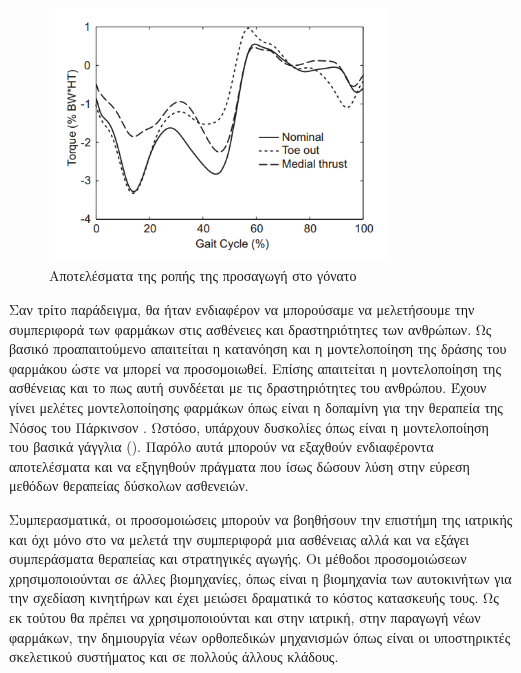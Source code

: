 \begin{figure}[H]
    \centering
    \includegraphics[width=0.8\textwidth]{introduction/fig/knee-load.png}
    \caption{Αποτελέσματα της ροπής της προσαγωγή στο γόνατο\cite{fregly07}}
    \label{fig:knee-load}
\end{figure}

Σαν τρίτο παράδειγμα, θα ήταν ενδιαφέρον να μπορούσαμε να μελετήσουμε την συμπεριφορά των φαρμάκων στις ασθένειες και δραστηριότητες των ανθρώπων. Ως βασικό προαπαιτούμενο απαιτείται η κατανόηση και η μοντελοποίηση της δράσης του φαρμάκου ώστε να μπορεί να προσομοιωθεί. Επίσης απαιτείται η μοντελοποίηση της ασθένειας και το πως αυτή συνδέεται με τις δραστηριότητες του ανθρώπου. Έχουν γίνει μελέτες μοντελοποίησης φαρμάκων όπως είναι η δοπαμίνη για την θεραπεία της Νόσος του Πάρκινσον \cite{haeri05}. Ωστόσο, υπάρχουν δυσκολίες όπως είναι η μοντελοποίηση του βασικά γάγγλια (). Παρόλο αυτά μπορούν να εξαχθούν ενδιαφέροντα αποτελέσματα και να εξηγηθούν πράγματα που ίσως δώσουν λύση στην εύρεση μεθόδων θεραπείας δύσκολων ασθενειών.

Συμπερασματικά, οι προσομοιώσεις μπορούν να βοηθήσουν την επιστήμη της ιατρικής και όχι μόνο στο να μελετά την συμπεριφορά μια ασθένειας αλλά και να εξάγει συμπεράσματα θεραπείας και στρατηγικές αγωγής. Οι μέθοδοι προσομοιώσεων χρησιμοποιούνται σε άλλες βιομηχανίες, όπως είναι η βιομηχανία των αυτοκινήτων για την σχεδίαση κινητήρων και έχει μειώσει δραματικά το κόστος κατασκευής τους. Ως εκ τούτου θα πρέπει να χρησιμοποιούνται και στην ιατρική, στην παραγωγή νέων φαρμάκων, την δημιουργία νέων ορθοπεδικών μηχανισμών όπως είναι οι υποστηρικτές σκελετικού συστήματος \cite{stopforth12} και σε πολλούς άλλους κλάδους.
